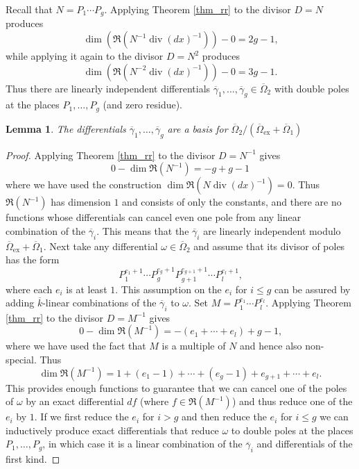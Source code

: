 \documentclass[12pt,reqno]{amsart}
\numberwithin{equation}{section}
\newtheorem{lemma}[theorem]{Lemma}
\newcommand{\op}[1]  { \operatorname{ #1 }}
\newcommand{\goR}[0]  { \mathfrak{R}}
\begin{document}
Recall that $N=P_1 \cdots P_g$. Applying Theorem \ref{thm_rr} to the divisor $D= N$ produces
\begin{equation*}
\op{dim} (\goR(N^{-1} \op{div}(dx)^{-1} )) - 0 = 2g-1\text{,}
\end{equation*}
while applying it again to the divisor $D= N^{2}$ produces
\begin{equation*}
\op{dim} (\goR(N^{-2} \op{div}(dx)^{-1} )) - 0 = 3g-1\text{.}
\end{equation*}
Thus there are linearly independent differentials $\overline{\gamma}_1,\dots,\overline{\gamma}_g \in \overline{\Omega}_2$ with double poles at the places $P_1,\dots,P_g$ (and zero residue).


\begin{lemma}
The differentials $\overline{\gamma}_1,\dots,\overline{\gamma}_g$ are a basis for $\overline{\Omega}_2/(\overline{\Omega}_{\op{ex}}+\overline{\Omega}_1)$
\end{lemma}
\begin{proof}
Applying Theorem \ref{thm_rr} to the divisor $D=N^{-1}$ gives
\begin{equation*}
0-\op{dim} \goR(N^{-1}) = -g +g-1 
\end{equation*}
where we have used the construction $\op{dim} \goR(N \op{div}(dx)^{-1})=0$. Thus $\goR(N^{-1})$ has dimension $1$ and consists of only the constants, and there are no functions whose differentials can cancel even one pole from any linear combination of the $\overline{\gamma}_i$. This means that the $\overline{\gamma}_i$ are linearly independent modulo $\overline{\Omega}_{\op{ex}}+\overline{\Omega}_1$. Next take any differential $\omega \in \overline{\Omega}_2$ and assume that its divisor of poles has the form
\begin{equation*}
P_1 ^{e_1+1} \cdots P_g^{e_g+1} P_{g+1}^{e_{g+1}+1} \cdots P_{l}^{e_{l}+1}\text{,}
\end{equation*}
where each $e_i$ is at least $1$. This assumption on the $e_i$ for $i \le g$ can be assured by adding $\overline{k}$-linear combinations of  the $\overline{\gamma}_i$ to $\omega$. Set $M=P_1 ^{e_1} \cdots P_{l}^{e_{l}}$. Applying Theorem \ref{thm_rr} to the divisor $D=M^{-1}$ gives
\begin{equation*}
0-\op{dim} \goR(M^{-1}) =  -(e_1+ \cdots + e_{l}) +g-1\text{,}
\end{equation*}
where we have used the fact that $M$ is a multiple of $N$ and hence also non-special. Thus
\begin{equation*}
\op{dim} \goR(M^{-1}) = 1 + (e_1-1)+\cdots + (e_g-1) + e_{g+1}+\cdots + e_{l}\text{.}
\end{equation*}
This provides enough functions to guarantee that we can cancel one of the poles of $\omega$ by an exact differential $df$ (where $f \in \goR(M^{-1})$) and thus reduce one of the $e_i$ by $1$. If we first reduce the $e_i$ for $i>g$ and then reduce the $e_i$ for $i \le g$ we can inductively produce exact differentials that reduce $\omega$ to double poles at the places $P_1,\dots,P_g$, in which case it is a linear combination of the $\overline{\gamma}_i$ and differentials of the first kind.
\end{proof}
\end{document}
